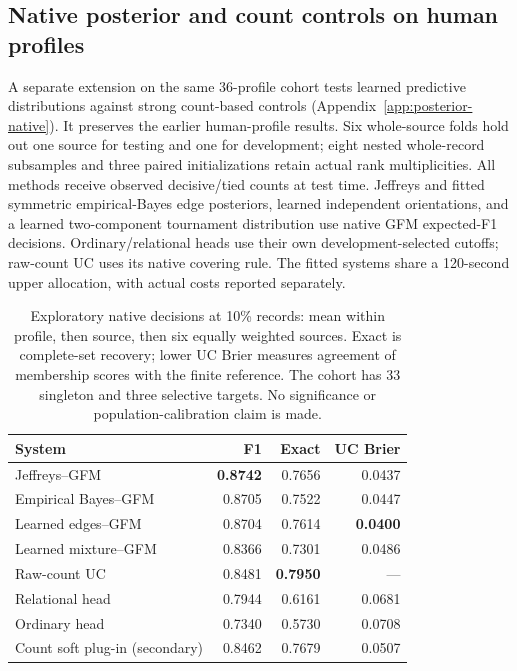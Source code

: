 \subsection{Native posterior and count controls on human profiles}\label{sec:posterior-native}
A separate extension on the same 36-profile cohort tests learned predictive distributions against strong count-based controls (Appendix~\ref{app:posterior-native}). It preserves the earlier human-profile results. Six whole-source folds hold out one source for testing and one for development; eight nested whole-record subsamples and three paired initializations retain actual rank multiplicities. All methods receive observed decisive/tied counts at test time. Jeffreys and fitted symmetric empirical-Bayes edge posteriors, learned independent orientations, and a learned two-component tournament distribution use native GFM expected-F1 decisions. Ordinary/relational heads use their own development-selected cutoffs; raw-count UC uses its native covering rule. The fitted systems share a 120-second upper allocation, with actual costs reported separately.

\begin{table}[t]\centering\scriptsize\setlength{\tabcolsep}{3pt}
\begin{tabular*}{\linewidth}{@{\extracolsep{\fill}}lrrr@{}}\toprule
System & F1 & Exact & UC Brier\\\midrule
Jeffreys--GFM & \textbf{0.8742} & 0.7656 & 0.0437\\
Empirical Bayes--GFM & 0.8705 & 0.7522 & 0.0447\\
Learned edges--GFM & 0.8704 & 0.7614 & \textbf{0.0400}\\
Learned mixture--GFM & 0.8366 & 0.7301 & 0.0486\\
Raw-count UC & 0.8481 & \textbf{0.7950} & ---\\
Relational head & 0.7944 & 0.6161 & 0.0681\\
Ordinary head & 0.7340 & 0.5730 & 0.0708\\\midrule
Count soft plug-in (secondary) & 0.8462 & 0.7679 & 0.0507\\\bottomrule
\end{tabular*}
\caption{Exploratory native decisions at 10\% records: mean within profile, then source, then six equally weighted sources. Exact is complete-set recovery; lower UC Brier measures agreement of membership scores with the finite reference. The cohort has 33 singleton and three selective targets. No significance or population-calibration claim is made.}
\label{tab:posterior-native-main}\end{table}

